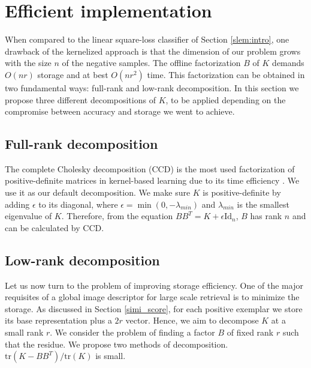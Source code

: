 
\section{Efficient implementation}\label{eff_imp}


When compared to the linear square-loss classifier of Section \ref{slem:intro}, one drawback of the kernelized approach is that the dimension of our problem grows with the size $n$ of the negative samples. The offline factorization $B$ of $K$ demands $O(nr)$ storage and at best $O(nr^2)$ time. 
This factorization can be obtained in two fundamental ways: full-rank and low-rank decomposition. In this section we propose three different decompositions of $K$, to be applied depending on the compromise between accuracy and storage we went to achieve.


\subsection{Full-rank decomposition}
The complete Cholesky decomposition (CCD) is the most used factorization of positive-definite matrices in kernel-based learning due to its time efficiency \cite{BaJo02}. We use it as our default decomposition.
We make sure $K$ is positive-definite by adding $\epsilon$ to its diagonal, where $\epsilon=\min(0,-\lambda_{min})$ and $\lambda_{min}$ is the smallest eigenvalue of $K$. Therefore, from the equation $BB^T=K+\epsilon\mathrm{Id}_n$, $B$ has rank $n$ and can be calculated by CCD.

\subsection{Low-rank decomposition}
Let us now turn to the problem of improving storage efficiency. One of the major requisites of a global image descriptor for large scale retrieval is to minimize the storage.
As discussed in Section \ref{simi_score}, for each positive exemplar we store its base representation plus a $2r$ vector. Hence, we aim to decompose $K$ at a small rank $r$.
We consider the problem of finding a factor $B$ of fixed rank $r$ such that the residue. We propose two methods of decomposition. $\mathrm{tr}(K-BB^T)/\mathrm{tr}(K)$ is small. 

